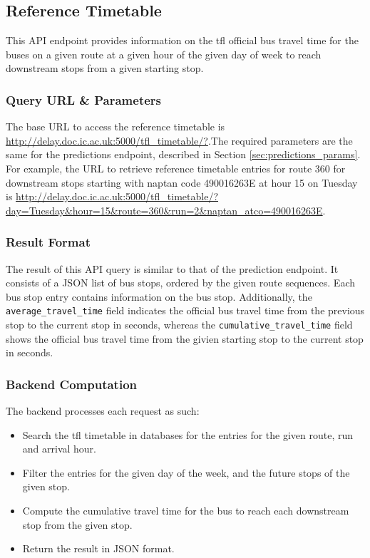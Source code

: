
\subsection{Reference Timetable}
\par This API endpoint provides information on the \acrshort{tfl} official bus travel time for the buses on a given route at a given hour of the given day of week to reach downstream stops from a given starting stop.

\subsubsection{Query URL \& Parameters}
\par The base URL to access the reference timetable is \url{http://delay.doc.ic.ac.uk:5000/tfl_timetable/?}.The required parameters are the same for the predictions endpoint, described in Section \ref{sec:predictions_params}. For example, the URL to retrieve reference timetable entries for route 360 for downstream stops starting with \gls{naptan} code 490016263E at hour 15 on Tuesday is \url{http://delay.doc.ic.ac.uk:5000/tfl_timetable/?day=Tuesday&hour=15&route=360&run=2&naptan_atco=490016263E}.

\subsubsection{Result Format}
\par The result of this API query is similar to that of the prediction endpoint. It consists of a JSON list of bus stops, ordered by the given route sequences. Each bus stop entry contains information on the bus stop. Additionally, the \texttt{average\_travel\_time} field indicates the official bus travel time from the previous stop to the current stop in seconds, whereas the \texttt{cumulative\_travel\_time} field shows the official bus travel time from the givien starting stop to the current stop in seconds.

\subsubsection{Backend Computation}
The backend processes each request as such:

\begin{itemize}
  \item Search the \acrshort{tfl} timetable in databases for the entries for the given route, run and arrival hour.
  \item Filter the entries for the given day of the week, and the future stops of the given stop.
  \item Compute the cumulative travel time for the bus to reach each downstream stop from the given stop.
  \item Return the result in JSON format.
\end{itemize}


